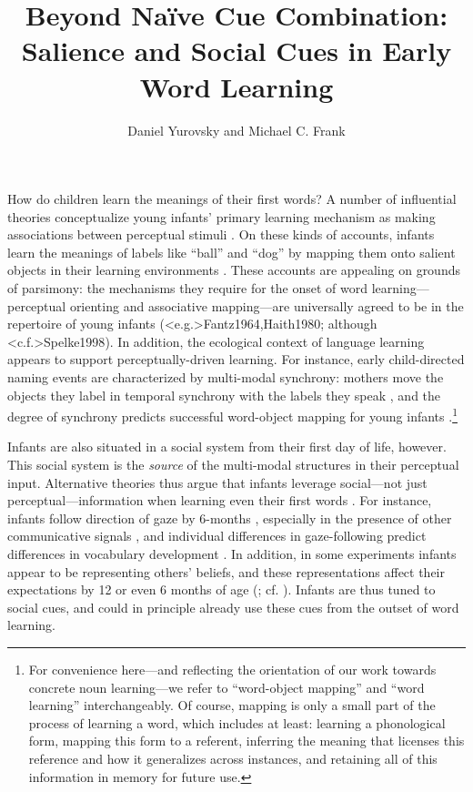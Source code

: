 \documentclass[man,floatsintext]{apa6}
\title{Beyond Na\"{i}ve Cue Combination: Salience and Social Cues in Early Word Learning}
\author{Daniel Yurovsky and Michael C. Frank}
\affiliation{Department of Psychology, Stanford University}
\begin{document}
\maketitle


How do children learn the meanings of their first words? A number of influential theories conceptualize young infants' primary learning mechanism as making associations between perceptual stimuli \cite{Piaget1952, Vygotsky1978}. On these kinds of accounts, infants learn the meanings of labels like ``ball'' and ``dog'' by mapping them onto salient objects in their learning environments \cite{Werker1998,Smith2000}. These accounts are appealing on grounds of parsimony: the mechanisms they require for the onset of word learning---perceptual orienting and associative mapping---are universally agreed to be in the repertoire of young infants (\citeNP<e.g.>{Fantz1964,Haith1980}; although \citeNP<c.f.>{Spelke1998}). In addition, the ecological context of language learning appears to support perceptually-driven learning. For instance, early child-directed naming events are characterized by multi-modal synchrony: mothers move the objects they label in temporal synchrony with the labels they speak \cite{Gogate2000}, and the degree of synchrony predicts successful word-object mapping for young infants \cite{Gogate2006}.\footnote{For convenience here---and reflecting the orientation of our work towards concrete noun learning---we refer to ``word-object mapping'' and ``word learning'' interchangeably. Of course, mapping is only a small part of the process of learning a word, which includes at least: learning a phonological form, mapping this form to a referent, inferring the meaning that licenses this reference and how it generalizes across instances, and retaining all of this information in memory for future use.}

Infants are also situated in a social system from their first day of life, however. This social system is the \emph{source} of the multi-modal structures in their perceptual input. Alternative theories thus argue that infants leverage social---not just perceptual---information when learning even their first words \cite{Bruner1983,Bloom1998}. For instance, infants follow direction of gaze by 6-months \cite{Dentremont1997}, especially in the presence of other communicative signals \cite{Senju2008}, and individual differences in gaze-following predict differences in vocabulary development \cite{Brooks2008}. In addition, in some experiments infants appear to be representing others' beliefs, and these representations affect their expectations by 12 or even 6 months of age (; cf. ). Infants are thus tuned to social cues, and could in principle already use these cues from the outset of word learning.
\end{document}

